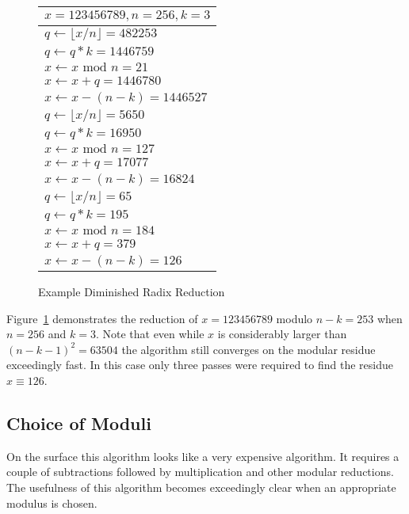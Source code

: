 \documentclass[b5paper]{book}
\begin{document}
\begin{figure}
\begin{small}
\begin{center}
\begin{tabular}{|l|}
\hline
$x = 123456789, n = 256, k = 3$ \\
\hline $q \leftarrow \lfloor x/n \rfloor = 482253$ \\
$q \leftarrow q*k = 1446759$ \\
$x \leftarrow x \mbox{ mod } n = 21$ \\
$x \leftarrow x + q = 1446780$ \\
$x \leftarrow x - (n - k) = 1446527$ \\
\hline 
$q \leftarrow \lfloor x/n \rfloor = 5650$ \\
$q \leftarrow q*k = 16950$ \\
$x \leftarrow x \mbox{ mod } n = 127$ \\
$x \leftarrow x + q = 17077$ \\
$x \leftarrow x - (n - k) = 16824$ \\
\hline 
$q \leftarrow \lfloor x/n \rfloor = 65$ \\
$q \leftarrow q*k = 195$ \\
$x \leftarrow x \mbox{ mod } n = 184$ \\
$x \leftarrow x + q = 379$ \\
$x \leftarrow x - (n - k) = 126$ \\
\hline
\end{tabular}
\end{center}
\end{small}
\caption{Example Diminished Radix Reduction}
\label{fig:EXDR}
\end{figure}

Figure~\ref{fig:EXDR} demonstrates the reduction of $x = 123456789$ modulo $n - k = 253$ when $n = 256$ and $k = 3$.  Note that even while $x$
is considerably larger than $(n - k - 1)^2 = 63504$ the algorithm still converges on the modular residue exceedingly fast.  In this case only
three passes were required to find the residue $x \equiv 126$.


\subsection{Choice of Moduli}
On the surface this algorithm looks like a very expensive algorithm.  It requires a couple of subtractions followed by multiplication and other
modular reductions.  The usefulness of this algorithm becomes exceedingly clear when an appropriate modulus is chosen.
\end{document}
